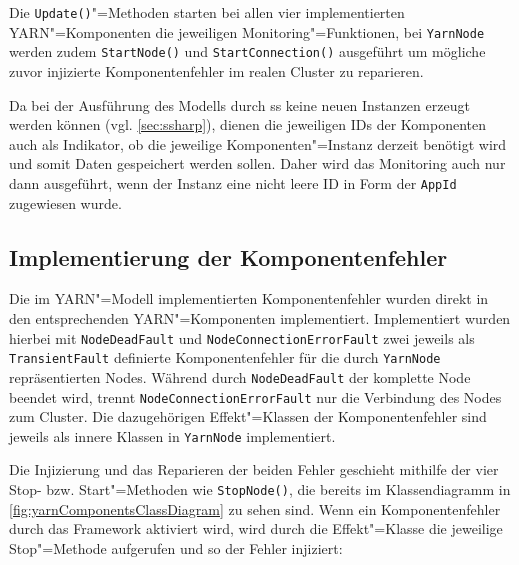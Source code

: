 Die \texttt{Update()}"=Methoden starten bei allen vier implementierten \gls{YARN}"=Komponenten die jeweiligen Monitoring"=Funktionen, bei \texttt{YarnNode} werden zudem \texttt{StartNode()} und \texttt{StartConnection()} ausgeführt um mögliche zuvor injizierte Komponentenfehler im realen Cluster zu reparieren.

Da bei der Ausführung des Modells durch \gls{ss} keine neuen Instanzen erzeugt werden können (vgl. \cref{sec:ssharp}), dienen die jeweiligen IDs der Komponenten auch als Indikator, ob die jeweilige Komponenten"=Instanz derzeit benötigt wird und somit Daten gespeichert werden sollen.
Daher wird das Monitoring auch nur dann ausgeführt, wenn der Instanz eine nicht leere ID \zB in Form der \texttt{AppId} zugewiesen wurde.

\subsection{Implementierung der Komponentenfehler}
\label{subsec:yarnComponentFaults}

Die im \gls{YARN}"=Modell implementierten Komponentenfehler wurden direkt in den entsprechenden \gls{YARN}"=Komponenten implementiert.
Implementiert wurden hierbei mit \texttt{NodeDeadFault} und \texttt{NodeConnectionErrorFault} zwei jeweils als \texttt{TransientFault} definierte Komponentenfehler für die durch \texttt{YarnNode} repräsentierten Nodes.
Während durch \texttt{NodeDeadFault} der komplette Node beendet wird, trennt \texttt{NodeConnectionErrorFault} nur die Verbindung des Nodes zum Cluster.
Die dazugehörigen Effekt"=Klassen der Komponentenfehler sind jeweils als innere Klassen in \texttt{YarnNode} implementiert.

Die Injizierung und das Reparieren der beiden Fehler geschieht mithilfe der vier Stop- bzw. Start"=Methoden wie \zB \texttt{StopNode()}, die bereits im Klassendiagramm in \cref{fig:yarnComponentsClassDiagram} zu sehen sind.
Wenn ein Komponentenfehler durch das Framework aktiviert wird, wird durch die Effekt"=Klasse die jeweilige Stop"=Methode aufgerufen und so der Fehler injiziert:

